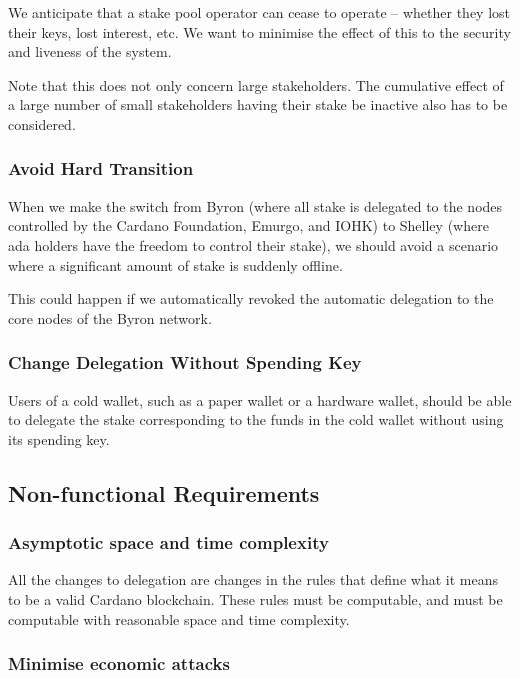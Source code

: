 \documentclass[11pt,a4paper]{article}
\begin{document}
We anticipate that a stake pool operator can cease to operate -- whether
they lost their keys, lost interest, etc. We want to minimise the
effect of this to the security and liveness of the system.


Note that this does not only concern large stakeholders. The cumulative effect
of a large number of small stakeholders having their stake be inactive also has
to be considered.


\subsubsection{Avoid Hard Transition}
\label{avoid-hard-transition}

When we make the switch from Byron (where all stake is delegated to the
nodes controlled by the Cardano Foundation, Emurgo, and IOHK) to Shelley
(where ada holders have the freedom to control their stake), we should
avoid a scenario where a significant amount of stake is suddenly
offline.

This could happen if we automatically revoked the automatic delegation
to the core nodes of the Byron network.

\subsubsection{Change Delegation Without Spending Key}
\label{change-delegation-without-spending-key}

Users of a cold wallet, such as a paper wallet or a hardware wallet,
should be able to delegate the stake corresponding to the funds in the
cold wallet without using its spending key.

\subsection{Non-functional Requirements}
\label{non-functional-requirements}

\subsubsection{Asymptotic space and time complexity}
\label{asymptotic-space-and-time-complexity}

All the changes to delegation are changes in the rules that define what
it means to be a valid Cardano blockchain. These rules must be
computable, and must be computable with reasonable space and time
complexity.

\subsubsection{Minimise economic attacks}
\label{minimise-economic-attacks}
\end{document}

